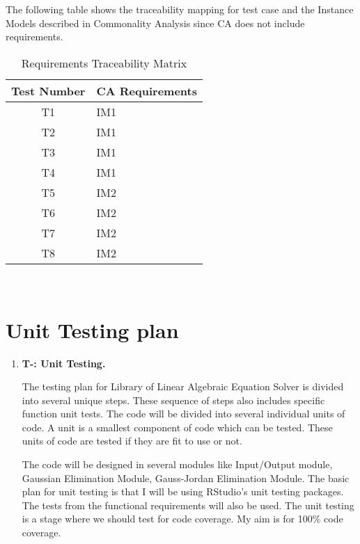 \documentclass[12pt, titlepage]{article}
\newcounter{tnum}
\begin{document}
The following table shows the traceability mapping for test case and the
Instance Models described in Commonality Analysis since CA does not include
requirements.

\begin{table} [H]
  \caption{Requirements Traceability Matrix}
  \label{Table:Table_Traceability}  
\begin{tabular}{|c|p{8cm}|}
  \hline	
  \textbf{Test Number} & \textbf{CA Requirements}\\
  \hline 
   T1& IM1\\ \hline
   T2& IM1\\ \hline
   T3& IM1\\ \hline
   T4& IM1\\ \hline
   T5& IM2\\ \hline
   T6& IM2\\ \hline
   T7& IM2\\ \hline
   T8& IM2\\ \hline
   
  

\end{tabular}\\
\end{table}

\section{Unit Testing plan}


\begin{enumerate}

\item{\textbf{T-\thetnum \label{t-accuracy}: Unit Testing.}}



The testing plan for Library of Linear Algebraic Equation Solver is divided into
several unique steps. These sequence of steps also includes specific function
unit tests. The code will be divided into several individual units of code. A
unit is a smallest component of code which can be tested. These units of code
are tested if they are fit to use or not.

The code will be designed in several modules like Input/Output module, Gaussian
Elimination Module, Gauss-Jordan Elimination Module. The basic plan for unit
testing is that I will be using RStudio's unit testing packages. The tests from
the functional requirements will also be used. The unit testing is a stage where
we should test for code coverage. My aim is for 100\% code coverage.
					

					
\end{enumerate}
\end{document}
